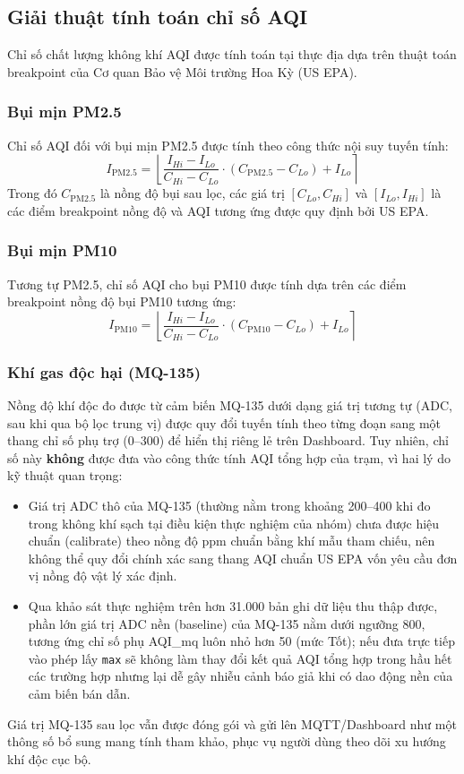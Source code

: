 \documentclass[12pt,a4paper]{article}
\begin{document}
\subsection{Giải thuật tính toán chỉ số AQI}
Chỉ số chất lượng không khí AQI được tính toán tại thực địa dựa trên thuật toán breakpoint của Cơ quan Bảo vệ Môi trường Hoa Kỳ (US EPA).

\subsubsection{Bụi mịn PM2.5}
Chỉ số AQI đối với bụi mịn PM2.5 được tính theo công thức nội suy tuyến tính:
\[
I_{\text{PM2.5}} = \left\lfloor \frac{I_{Hi} - I_{Lo}}{C_{Hi} - C_{Lo}} \cdot (C_{\text{PM2.5}} - C_{Lo}) + I_{Lo} \right\rceil
\]
Trong đó $C_{\text{PM2.5}}$ là nồng độ bụi sau lọc, các giá trị $[C_{Lo}, C_{Hi}]$ và $[I_{Lo}, I_{Hi}]$ là các điểm breakpoint nồng độ và AQI tương ứng được quy định bởi US EPA.

\subsubsection{Bụi mịn PM10}
Tương tự PM2.5, chỉ số AQI cho bụi PM10 được tính dựa trên các điểm breakpoint nồng độ bụi PM10 tương ứng:
\[
I_{\text{PM10}} = \left\lfloor \frac{I_{Hi} - I_{Lo}}{C_{Hi} - C_{Lo}} \cdot (C_{\text{PM10}} - C_{Lo}) + I_{Lo} \right\rceil
\]

\subsubsection{Khí gas độc hại (MQ-135)}
Nồng độ khí độc đo được từ cảm biến MQ-135 dưới dạng giá trị tương tự (ADC, sau khi qua bộ lọc trung vị) được quy đổi tuyến tính theo từng đoạn sang một thang chỉ số phụ trợ (0--300) để hiển thị riêng lẻ trên Dashboard. Tuy nhiên, chỉ số này \textbf{không} được đưa vào công thức tính AQI tổng hợp của trạm, vì hai lý do kỹ thuật quan trọng:
\begin{itemize}
    \item Giá trị ADC thô của MQ-135 (thường nằm trong khoảng 200--400 khi đo trong không khí sạch tại điều kiện thực nghiệm của nhóm) chưa được hiệu chuẩn (calibrate) theo nồng độ ppm chuẩn bằng khí mẫu tham chiếu, nên không thể quy đổi chính xác sang thang AQI chuẩn US EPA vốn yêu cầu đơn vị nồng độ vật lý xác định.
    \item Qua khảo sát thực nghiệm trên hơn 31.000 bản ghi dữ liệu thu thập được, phần lớn giá trị ADC nền (baseline) của MQ-135 nằm dưới ngưỡng 800, tương ứng chỉ số phụ AQI\_mq luôn nhỏ hơn 50 (mức Tốt); nếu đưa trực tiếp vào phép lấy \texttt{max} sẽ không làm thay đổi kết quả AQI tổng hợp trong hầu hết các trường hợp nhưng lại dễ gây nhiễu cảnh báo giả khi có dao động nền của cảm biến bán dẫn.
\end{itemize}
Giá trị MQ-135 sau lọc vẫn được đóng gói và gửi lên MQTT/Dashboard như một thông số bổ sung mang tính tham khảo, phục vụ người dùng theo dõi xu hướng khí độc cục bộ.
\end{document}

